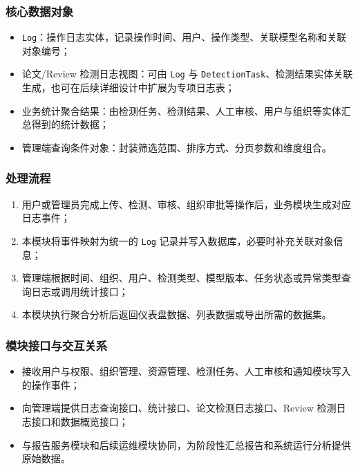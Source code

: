 \subsubsection{核心数据对象}
\begin{itemize}[leftmargin=2em]
    \item \texttt{Log}：操作日志实体，记录操作时间、用户、操作类型、关联模型名称和关联对象编号；
    \item 论文/Review 检测日志视图：可由 \texttt{Log} 与 \texttt{DetectionTask}、检测结果实体关联生成，也可在后续详细设计中扩展为专项日志表；
    \item 业务统计聚合结果：由检测任务、检测结果、人工审核、用户与组织等实体汇总得到的统计数据；
    \item 管理端查询条件对象：封装筛选范围、排序方式、分页参数和维度组合。
\end{itemize}

\subsubsection{处理流程}
\begin{enumerate}[leftmargin=2em]
    \item 用户或管理员完成上传、检测、审核、组织审批等操作后，业务模块生成对应日志事件；
    \item 本模块将事件映射为统一的 \texttt{Log} 记录并写入数据库，必要时补充关联对象信息；
    \item 管理端根据时间、组织、用户、检测类型、模型版本、任务状态或异常类型查询日志或调用统计接口；
    \item 本模块执行聚合分析后返回仪表盘数据、列表数据或导出所需的数据集。
\end{enumerate}

\subsubsection{模块接口与交互关系}
\begin{itemize}[leftmargin=2em]
    \item 接收用户与权限、组织管理、资源管理、检测任务、人工审核和通知模块写入的操作事件；
    \item 向管理端提供日志查询接口、统计接口、论文检测日志接口、Review 检测日志接口和数据概览接口；
    \item 与报告服务模块和后续运维模块协同，为阶段性汇总报告和系统运行分析提供原始数据。
\end{itemize}

